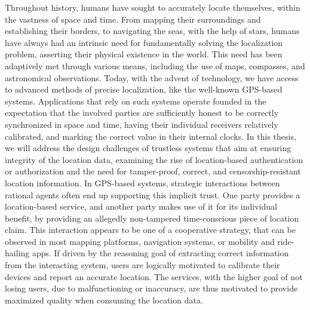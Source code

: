 

Throughout history, humans have sought to accurately locate themselves, within the vastness of space and time. From mapping their surroundings and establishing their borders, to navigating the seas, with the help of stars, humans have always had an intrinsic need for fundamentally solving the localization problem, asserting their physical existence in the world. This need has been adaptively met through various means, including the use of maps, compasses, and astronomical observations. Today, with the advent of technology, we have access to advanced methods of precise localization, like the well-known GPS-based systems. Applications that rely on such systems operate founded in the expectation that the involved parties are sufficiently honest to be correctly synchronized in space and time, having their individual receivers relatively calibrated, and marking the correct value in their internal clocks. In this thesis, we will address the design challenges of trustless systems that aim at ensuring integrity of the location data, examining the rise of location-based authentication or authorization and the need for tamper-proof, correct, and censorship-resistant location information. In GPS-based systems, strategic interactions between rational agents often end up supporting this implicit trust. One party provides a location-based service, and another party makes use of it for its individual benefit, by providing an allegedly non-tampered time-conscious piece of location claim. This interaction appears to be one of a cooperative strategy, that can be observed in most mapping platforms, navigation systems, or mobility and ride-hailing apps. If driven by the reasoning goal of extracting correct information from the interacting system, users are logically motivated to calibrate their devices and report an accurate location. The services, with the higher goal of not losing users, due to malfunctioning or inaccuracy, are thus motivated to provide maximized quality when consuming the location data. 


